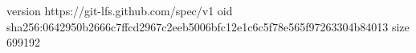 version https://git-lfs.github.com/spec/v1
oid sha256:0642950b2666c7ffcd2967c2eeb5006bfc12e1c6c5f78e565f97263304b84013
size 699192
